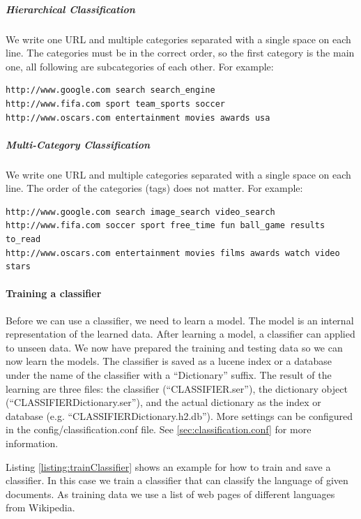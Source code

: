 \subparagraph{Hierarchical Classification}
We write one URL and multiple categories separated with a single space on each line. The categories must be in the correct order, so the first category is the main one, all following are subcategories of each other. For example:
\begin{verbatim}
http://www.google.com search search_engine
http://www.fifa.com sport team_sports soccer 
http://www.oscars.com entertainment movies awards usa
\end{verbatim}

\subparagraph{Multi-Category Classification}
We write one URL and multiple categories separated with a single space on each line. The order of the categories (tags) does not matter. For example:
\begin{verbatim}
http://www.google.com search image_search video_search
http://www.fifa.com soccer sport free_time fun ball_game results to_read
http://www.oscars.com entertainment movies films awards watch video stars
\end{verbatim}

\paragraph{Training a classifier}
Before we can use a classifier, we need to learn a model. The model is an internal representation of the learned data. After learning a model, a classifier can applied to unseen data. We now have prepared the training and testing data so we can now learn the models.
The classifier is saved as a lucene index or a database under the name of the classifier with a ``Dictionary'' suffix. The result of the learning are three files: the classifier (``CLASSIFIER.ser''), the dictionary object (``CLASSIFIERDictionary.ser''), and the actual dictionary as the index or database (e.g. ``CLASSIFIERDictionary.h2.db''). More settings can be configured in the config/classification.conf file. See \ref{sec:classification.conf} for more information.

Listing \ref{listing:trainClassifier} shows an example for how to train and save a classifier. In this case we train a classifier that can classify the language of given documents. As training data we use a list of web pages of different languages from Wikipedia.

